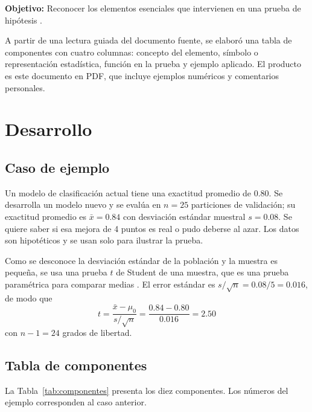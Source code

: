 \documentclass[11pt,letterpaper]{article}
\begin{document}
\textbf{Objetivo:} Reconocer los elementos esenciales que intervienen en una prueba de hipótesis \parencite{tecnm2026_documento_fuente}.

A partir de una lectura guiada del documento fuente, se elaboró una tabla de componentes con cuatro columnas: concepto del elemento, símbolo o representación estadística, función en la prueba y ejemplo aplicado. El producto es este documento en PDF, que incluye ejemplos numéricos y comentarios personales.

\newpage
\section{Desarrollo}

\subsection{Caso de ejemplo}

Un modelo de clasificación actual tiene una exactitud promedio de 0.80. Se desarrolla un modelo nuevo y se evalúa en $n = 25$ particiones de validación; su exactitud promedio es $\bar{x} = 0.84$ con desviación estándar muestral $s = 0.08$. Se quiere saber si esa mejora de 4 puntos es real o pudo deberse al azar. Los datos son hipotéticos y se usan solo para ilustrar la prueba.

Como se desconoce la desviación estándar de la población y la muestra es pequeña, se usa una prueba $t$ de Student de una muestra, que es una prueba paramétrica para comparar medias \parencite{tecnm2026_documento_fuente}. El error estándar es $s/\sqrt{n} = 0.08/5 = 0.016$, de modo que
\[
t = \frac{\bar{x} - \mu_0}{s/\sqrt{n}} = \frac{0.84 - 0.80}{0.016} = 2.50
\]
con $n - 1 = 24$ grados de libertad.

\subsection{Tabla de componentes}

La Tabla~\ref{tab:componentes} presenta los diez componentes. Los números del ejemplo corresponden al caso anterior.
\end{document}
